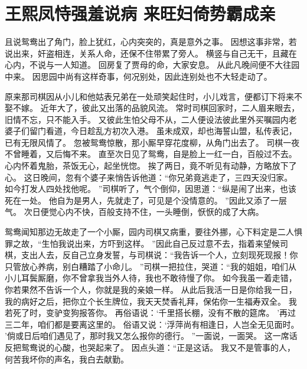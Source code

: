 \chapter{王熙凤恃强羞说病 \quad 来旺妇倚势霸成亲}
\par
且说鸳鸯出了角门，脸上犹红，心内突突的，真是意外之事。
因想这事非常，若说出来，奸盗相连，关系人命，还保不住带累了旁人。
横竖与自己无干，且藏在心内，不说与一人知道。
回房复了贾母的命，大家安息。
从此凡晚间便不大往园中来。
因思园中尚有这样奇事，何况别处，因此连别处也不大轻走动了。
\par
原来那司棋因从小儿和他姑表兄弟在一处顽笑起住时，小儿戏言，便都订下将来不娶不嫁。
近年大了，彼此又出落的品貌风流。
常时司棋回家时，二人眉来眼去，旧情不忘，只不能入手。
又彼此生怕父母不从，二人便设法彼此里外买嘱园内老婆子们留门看道，今日趁乱方初次入港。
虽未成双，却也海誓山盟，私传表记，已有无限风情了。
忽被鸳鸯惊散，那小厮早穿花度柳，从角门出去了。
司棋一夜不曾睡着，又后悔不来。
直至次日见了鸳鸯，自是脸上一红一白，百般过不去。
心内怀着鬼胎，茶饭无心，起坐恍惚。
挨了两日，竟不听见有动静，方略放下了心。
这日晚间，忽有个婆子来悄告诉他道：“你兄弟竟逃走了，三四天没归家。
如今打发人四处找他呢。
”司棋听了，气个倒仰，因思道：“纵是闹了出来，也该死在一处。
他自为是男人，先就走了，可见是个没情意的。
”因此又添了一层气。
次日便觉心内不快，百般支持不住，一头睡倒，恹恹的成了大病。
\par
鸳鸯闻知那边无故走了一个小厮，园内司棋又病重，要往外挪，心下料定是二人惧罪之故，“生怕我说出来，方吓到这样。
”因此自己反过意不去，指着来望候司棋，支出人去，反自己立身发誓，与司棋说：“我告诉一个人，立刻现死现报！你只管放心养病，别白糟踏了小命儿。
”司棋一把拉住，哭道：“我的姐姐，咱们从小儿耳鬓厮磨，你不曾拿我当外人待，我也不敢待慢了你。
如今我虽一着走错，你若果然不告诉一个人，你就是我的亲娘一样。
从此后我活一日是你给我一日，我的病好之后，把你立个长生牌位，我天天焚香礼拜，保佑你一生福寿双全。
我若死了时，变驴变狗报答你。
再俗语说：‘千里搭长棚，没有不散的筵席。
’再过三二年，咱们都是要离这里的。
俗语又说：‘浮萍尚有相逢日，人岂全无见面时。
’倘或日后咱们遇见了，那时我又怎么报你的德行。
”一面说，一面哭。
这一席话反把鸳鸯说的心酸，也哭起来了。
因点头道：“正是这话。
我又不是管事的人，何苦我坏你的声名，我白去献勤。
